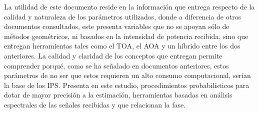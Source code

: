La utilidad de este documento reside en la información que entrega respecto de la calidad y naturaleza de los parámetros utilizados, donde a diferencia de otros documentos consultados, este presenta variables que no se apoyan sólo de métodos geométricos, ni basados en la intensidad de potencia recibida, sino que entregan herramientas tales como el \ac{TOA}, el \ac{AOA} y un híbrido entre los dos anteriores. La calidad y claridad de los conceptos que entregan permite comprender porqué, como se ha señalado en documentos anteriores, estos parámetros de no ser que estos requieren un alto consumo computacional, serían la base de los IPS. Presenta en este estudio, procedimientos probabilísticos para dotar de mayor precisión a la estimación, herramientas basadas en análisis espectrales de las señales recibidas y que relacionan la fase.

%


